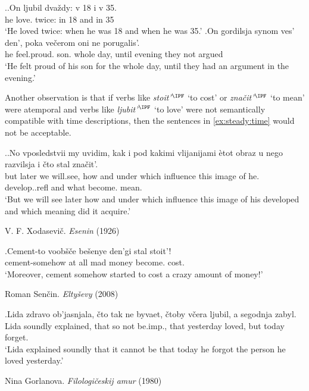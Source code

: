 \ex.\label{ex:steady:adv}\ag.On ljubil dva\v{z}dy: v 18 i v 35.\\
he love. twice: in 18 and in 35\\
\vspace{0.5em}
`He loved twice: when he was 18 and when he was 35.'
\bg.On gordilsja synom ves' den', poka ve\v{c}erom oni ne porugalis'.\\
he feel.proud. son. whole day, until evening they not argued\\
\vspace{0.5em}
`He felt proud of his son for the whole day, until they had an argument in the evening.'

Another observation is that if verbs like \textit{stoit'}$^{\IPF}$ `to cost' or \textit{zna\v{c}it'}$^{\IPF}$ `to mean' were atemporal and verbs like \textit{ljubit'$^{\IPF}$} `to love' were not semantically compatible with time descriptions, then the sentences in \ref{ex:steady:time} would not be acceptable.

\ex.\label{ex:steady:time}\ag.No vposledstvii my uvidim, kak i pod kakimi vlijanijami \`{e}tot obraz u nego razvilsja i \v{c}to stal zna\v{c}it'.\\
but later we will.see, how and under which influence this image of he. develop..refl and what become. mean.\\
\vspace{0.5em}
`But we will see later how and under which influence this image of his developed and which meaning did it acquire.'
\begin{flushright}
\vspace{-0.5em}
V. F. Xodasevi\v{c}. \textit{Esenin} (1926)
\end{flushright}
\bg.Cement-to voob\v{s}\v{c}e be\v{s}enye den'gi stal stoit'!\\
cement-somehow {at all} mad money become. cost.\\
\vspace{0.5em}
`Moreover, cement somehow started to cost a crazy amount of money!'
\begin{flushright}
\vspace{-0.5em}
Roman Sen\v{c}in. \textit{Elty\v{s}evy} (2008)
\end{flushright}
\bg.Lida zdravo ob'jasnjala, \v{c}to tak ne byvaet, \v{c}toby v\v{c}era ljubil, a segodnja zabyl.\\
Lida soundly explained, that so not be.imp., that yesterday loved, but today forget.\\
\vspace{0.5em}
`Lida explained soundly that it cannot be that today he forgot the person he loved yesterday.'
\begin{flushright}
\vspace{-0.5em}
Nina Gorlanova. \textit{Filologi\v{c}eskij amur} (1980)
\end{flushright}

